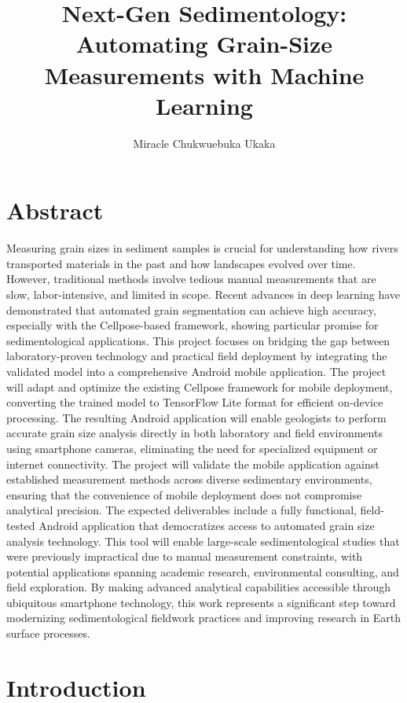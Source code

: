 \documentclass[project-plan]{report-template}
\title{Next-Gen Sedimentology: Automating Grain-Size Measurements with Machine Learning}
\author{Miracle Chukwuebuka Ukaka}
\begin{document}
\maketitlepage  %

\tableofcontents
\newpage

\section{Abstract}
Measuring grain sizes in sediment samples is crucial for understanding how rivers transported materials in the past and how landscapes evolved over time. However, traditional methods involve tedious manual measurements that are slow, labor-intensive, and limited in scope. Recent advances in deep learning have demonstrated that automated grain segmentation can achieve high accuracy, especially with the Cellpose-based framework, showing particular promise for sedimentological applications. This project focuses on bridging the gap between laboratory-proven technology and practical field deployment by integrating the validated model into a comprehensive Android mobile application. The project will adapt and optimize the existing Cellpose framework for mobile deployment, converting the trained model to TensorFlow Lite format for efficient on-device processing. The resulting Android application will enable geologists to perform accurate grain size analysis directly in both laboratory and field environments using smartphone cameras, eliminating the need for specialized equipment or internet connectivity. The project will validate the mobile application against established measurement methods across diverse sedimentary environments, ensuring that the convenience of mobile deployment does not compromise analytical precision. The expected deliverables include a fully functional, field-tested Android application that democratizes access to automated grain size analysis technology. This tool will enable large-scale sedimentological studies that were previously impractical due to manual measurement constraints, with potential applications spanning academic research, environmental consulting, and field exploration. By making advanced analytical capabilities accessible through ubiquitous smartphone technology, this work represents a significant step toward modernizing sedimentological fieldwork practices and improving research in Earth surface processes.
\newline



\section{Introduction}
\end{document}
